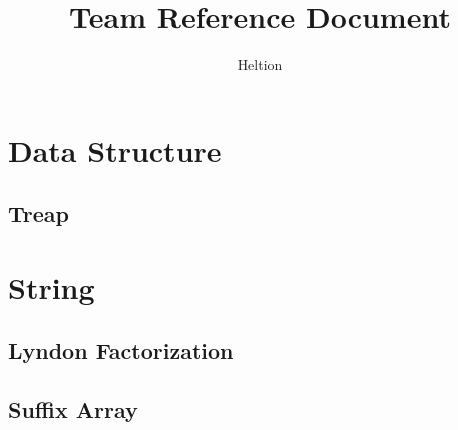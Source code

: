\documentclass{article}
\begin{document}
\title{Team Reference Document}
\author{Heltion}
\maketitle
\newpage
\begin{multicols}{2}
    \tableofcontents
    \newpage
    \section{Data Structure}
    \subsection{Treap}
    
    \section{String}
    \subsection{Lyndon Factorization}
    
    \subsection{Suffix Array}
    
\end{multicols}
\end{document}
